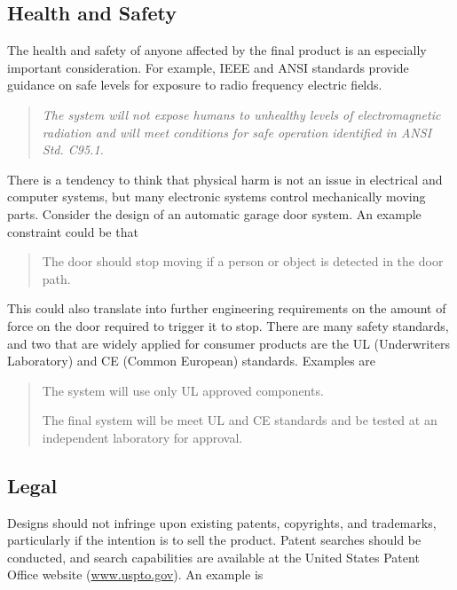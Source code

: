 \subsection*{Health and Safety}
\label{section:health-and-safety}

The health and safety of anyone affected by the final product is an
especially important consideration. For example, IEEE and ANSI standards
provide guidance on safe levels for exposure to radio frequency electric
fields.

\begin{quote}
\emph{The system will not expose humans to unhealthy levels of
electromagnetic radiation and will meet conditions for safe operation
identified in ANSI Std. C95.1.}
\end{quote}

There is a tendency to think that physical harm is not an issue in
electrical and computer systems, but many electronic systems control
mechanically moving parts. Consider the design of an automatic garage
door system. An example constraint could be that

\begin{quote}
The door should stop moving if a person or object is detected in the
door path.
\end{quote}

This could also translate into further engineering requirements on the
amount of force on the door required to trigger it to stop. There are
many safety standards, and two that are widely applied for consumer
products are the UL (Underwriters Laboratory) and CE (Common European)
standards. Examples are

\begin{quote}
The system will use only UL approved components.

The final system will be meet UL and CE standards and be tested at an
independent laboratory for approval.
\end{quote}

\subsection*{Legal}
\label{section:legal}

Designs should not infringe upon existing patents, copyrights, and
trademarks, particularly if the intention is to sell the product. Patent
searches should be conducted, and search capabilities are available at
the United States Patent Office website
(\href{http://www.uspto.gov}{www.uspto.gov}). An example is

